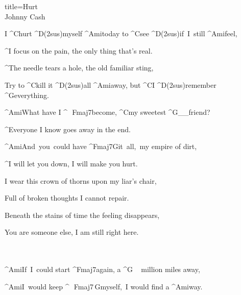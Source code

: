 \begin{song}{title=\predtitle\centering Hurt \\\large Johnny Cash \vspace*{-0.3cm}}  %
\begin{centerjustified}
\nejvetsi

\sloka
	I ^{C}hurt ^{D(2sus)}myself ^{Ami}today to ^{C}see ^{\:D(2sus)}if~I~still ^{Ami}feel,

	^{\phantom{.}}I focus on the pain, the only thing that's real.

   	^{\phantom{.}}The needle tears a hole, the old familiar sting,

	Try to ^{C}kill it ^{D(2sus)}all ^{Ami}away, but ^{C}I ^{\:\:D(2sus)}remember ^{G}everything.


	^{Ami}What have I ^{\,\,\,\,Fmaj7}become, ^{C}my sweetest ^{G{\color{white}\_\_}}friend?

	^{\phantom{.}}Everyone I know goes away in the end.

	^{Ami\:\:\:}And~you~could have ^{\z Fmaj7G\:}it~all,~my empire of dirt,

	^{\phantom{.}}I will let you down, I will make you hurt.

\sloka
	 I wear this crown of thorns upon my liar's chair,

   	Full of broken thoughts I cannot repair.

   	Beneath the stains of time the feeling disappears,

   	You are someone else, I am still right here.


\\\\

	^{Ami\z}If~I~could start ^{Fmaj7}again, a ^{G\,\,\,\,\,\,\,}million miles away,

	^{Ami\z}I~would keep ^{\,\,\,\,Fmaj7\z \,G}myself,~I would find a ^{Ami}way.

\end{centerjustified}
\setcounter{Slokočet}{0}
\end{song}
